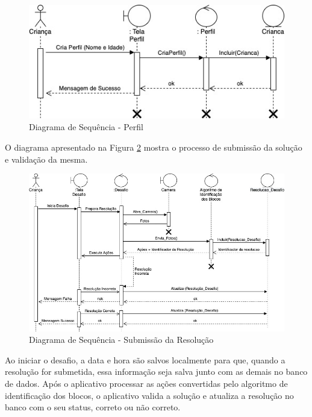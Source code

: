         \begin{figure}[H]
            \caption{Diagrama de Sequência - Perfil}
            \centering
                \includegraphics[width=\linewidth]{Imagens/cap3/Sequencia_Perfil.jpg}
    
            \label{figura:sequencia_perfil}
        \end{figure}
        
        
        O diagrama apresentado na Figura \ref{figura:sequencia_jogo} mostra o processo de submissão da solução e validação da mesma.
        
        \begin{figure}[H]
            \caption{Diagrama de Sequência - Submissão da Resolução}
            \centering
                \includegraphics[width=\linewidth]{Imagens/cap3/Sequencia_Jogo.jpg}
    
            \label{figura:sequencia_jogo}
        \end{figure}
        
        Ao iniciar o desafio, a data e hora são salvos localmente para que, quando a resolução for submetida, essa informação seja salva junto com as demais no banco de dados.
        Após o aplicativo processar as ações convertidas pelo algoritmo de identificação dos blocos, o aplicativo valida a solução e atualiza a resolução no banco com o seu status, correto ou não correto.